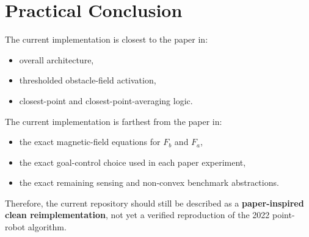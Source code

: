 \documentclass[11pt]{article}
\begin{document}
\section*{Practical Conclusion}

The current implementation is closest to the paper in:

\begin{itemize}[leftmargin=*]
  \item overall architecture,
  \item thresholded obstacle-field activation,
  \item closest-point and closest-point-averaging logic.
\end{itemize}

The current implementation is farthest from the paper in:

\begin{itemize}[leftmargin=*]
  \item the exact magnetic-field equations for \(F_b\) and \(F_a\),
  \item the exact goal-control choice used in each paper experiment,
  \item the exact remaining sensing and non-convex benchmark abstractions.
\end{itemize}

Therefore, the current repository should still be described as a
\textbf{paper-inspired clean reimplementation}, not yet a verified reproduction
of the 2022 point-robot algorithm.
\end{document}
